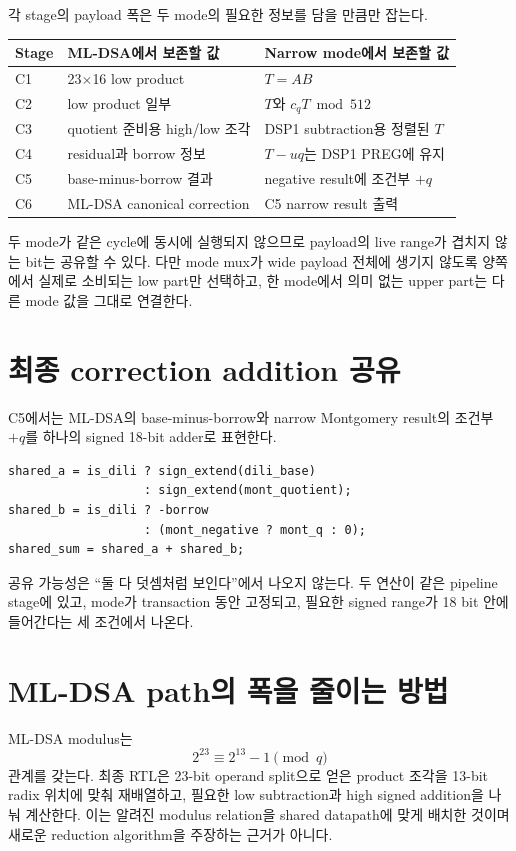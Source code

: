 각 stage의 payload 폭은 두 mode의 필요한 정보를 담을 만큼만 잡는다.

\begin{longtable}{C{15mm}L{52mm}L{94mm}}
\toprule
Stage & ML-DSA에서 보존할 값 & Narrow mode에서 보존할 값 \\
\midrule
C1 & 23$\times$16 low product & $T=A B$ \\
C2 & low product 일부 & $T$와 $c_qT\bmod512$ \\
C3 & quotient 준비용 high/low 조각 & DSP1 subtraction용 정렬된 $T$ \\
C4 & residual과 borrow 정보 & $T-uq$는 DSP1 PREG에 유지 \\
C5 & base-minus-borrow 결과 & negative result에 조건부 $+q$ \\
C6 & ML-DSA canonical correction & C5 narrow result 출력 \\
\bottomrule
\end{longtable}

두 mode가 같은 cycle에 동시에 실행되지 않으므로 payload의 live range가 겹치지
않는 bit는 공유할 수 있다. 다만 mode mux가 wide payload 전체에 생기지 않도록
양쪽에서 실제로 소비되는 low part만 선택하고, 한 mode에서 의미 없는 upper
part는 다른 mode 값을 그대로 연결한다.

\section{최종 correction addition 공유}

C5에서는 ML-DSA의 base-minus-borrow와 narrow Montgomery result의 조건부 $+q$를
하나의 signed 18-bit adder로 표현한다.

\begin{lstlisting}
shared_a = is_dili ? sign_extend(dili_base)
                   : sign_extend(mont_quotient);
shared_b = is_dili ? -borrow
                   : (mont_negative ? mont_q : 0);
shared_sum = shared_a + shared_b;
\end{lstlisting}

공유 가능성은 ``둘 다 덧셈처럼 보인다''에서 나오지 않는다. 두 연산이 같은
pipeline stage에 있고, mode가 transaction 동안 고정되고, 필요한 signed range가
18 bit 안에 들어간다는 세 조건에서 나온다.

\section{ML-DSA path의 폭을 줄이는 방법}

ML-DSA modulus는
\[
2^{23}\equiv 2^{13}-1\pmod q
\]
관계를 갖는다. 최종 RTL은 23-bit operand split으로 얻은 product 조각을 13-bit
radix 위치에 맞춰 재배열하고, 필요한 low subtraction과 high signed addition을
나눠 계산한다. 이는 알려진 modulus relation을 shared datapath에 맞게 배치한
것이며 새로운 reduction algorithm을 주장하는 근거가 아니다.

